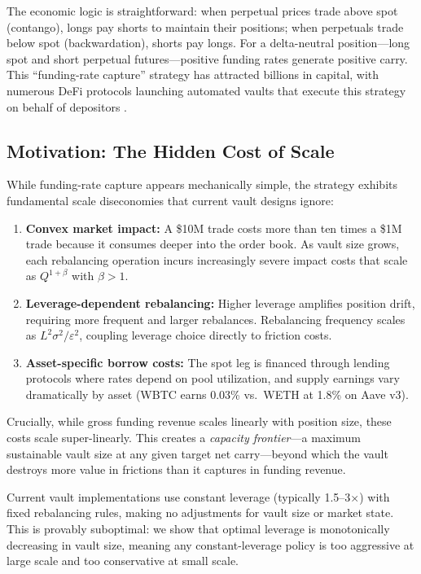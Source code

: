\documentclass[11pt]{article}
\begin{document}
The economic logic is straightforward: when perpetual prices trade above spot (contango), longs pay shorts to maintain their positions; when perpetuals trade below spot (backwardation), shorts pay longs. For a delta-neutral position---long spot and short perpetual futures---positive funding rates generate positive carry. This ``funding-rate capture'' strategy has attracted billions in capital, with numerous DeFi protocols launching automated vaults that execute this strategy on behalf of depositors \citep{ribbon_finance, friktion, cega}.

\subsection{Motivation: The Hidden Cost of Scale}

While funding-rate capture appears mechanically simple, the strategy exhibits fundamental scale diseconomies that current vault designs ignore:

\begin{enumerate}
\item \textbf{Convex market impact:} A \$10M trade costs more than ten times a \$1M trade because it consumes deeper into the order book. As vault size grows, each rebalancing operation incurs increasingly severe impact costs that scale as $Q^{1+\beta}$ with $\beta > 1$.

\item \textbf{Leverage-dependent rebalancing:} Higher leverage amplifies position drift, requiring more frequent and larger rebalances. Rebalancing frequency scales as $L^2 \sigma^2 / \varepsilon^2$, coupling leverage choice directly to friction costs.

\item \textbf{Asset-specific borrow costs:} The spot leg is financed through lending protocols where rates depend on pool utilization, and supply earnings vary dramatically by asset (WBTC earns 0.03\% vs.\ WETH at 1.8\% on Aave v3).
\end{enumerate}

Crucially, while gross funding revenue scales linearly with position size, these costs scale super-linearly. This creates a \textit{capacity frontier}---a maximum sustainable vault size at any given target net carry---beyond which the vault destroys more value in frictions than it captures in funding revenue.

Current vault implementations use constant leverage (typically 1.5--3$\times$) with fixed rebalancing rules, making no adjustments for vault size or market state. This is provably suboptimal: we show that optimal leverage is monotonically decreasing in vault size, meaning any constant-leverage policy is too aggressive at large scale and too conservative at small scale.
\end{document}
